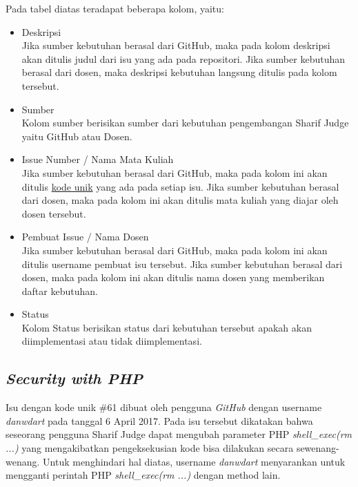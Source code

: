 Pada tabel diatas teradapat beberapa kolom, yaitu:
\begin{itemize}
	\item Deskripsi \\
	Jika sumber kebutuhan berasal dari GitHub, maka pada kolom deskripsi akan ditulis judul dari isu yang ada pada repositori. Jika sumber kebutuhan berasal dari dosen, maka deskripsi kebutuhan langsung ditulis pada kolom tersebut.
	\item Sumber \\
	Kolom sumber berisikan sumber dari kebutuhan pengembangan Sharif Judge yaitu GitHub atau Dosen.
	\item Issue Number / Nama Mata Kuliah \\
	Jika sumber kebutuhan berasal dari GitHub, maka pada kolom ini akan ditulis \hyperref[sec:analisis]{kode unik} yang ada pada setiap isu. Jika sumber kebutuhan berasal dari dosen, maka pada kolom ini akan ditulis mata kuliah yang diajar oleh dosen tersebut.
	\item Pembuat Issue / Nama Dosen \\
	Jika sumber kebutuhan berasal dari GitHub, maka pada kolom ini akan ditulis username pembuat isu tersebut. Jika sumber kebutuhan berasal dari dosen, maka pada kolom ini akan ditulis nama dosen yang memberikan daftar kebutuhan.
	\item Status \\
	Kolom Status berisikan status dari kebutuhan tersebut apakah akan diimplementasi atau tidak diimplementasi.
\end{itemize}


\subsection{\textit{Security with PHP}}
Isu dengan kode unik \#61 dibuat oleh pengguna \textit{GitHub} dengan username \textit{danwdart} pada tanggal 6 April 2017. Pada isu tersebut dikatakan bahwa seseorang pengguna Sharif Judge dapat mengubah parameter PHP \textit{shell\_exec(rm ...)} yang mengakibatkan pengeksekusian kode bisa dilakukan secara sewenang-wenang. Untuk menghindari hal diatas, username \textit{danwdart} menyarankan untuk mengganti perintah PHP \textit{shell\_exec(rm ...)} dengan method lain.

